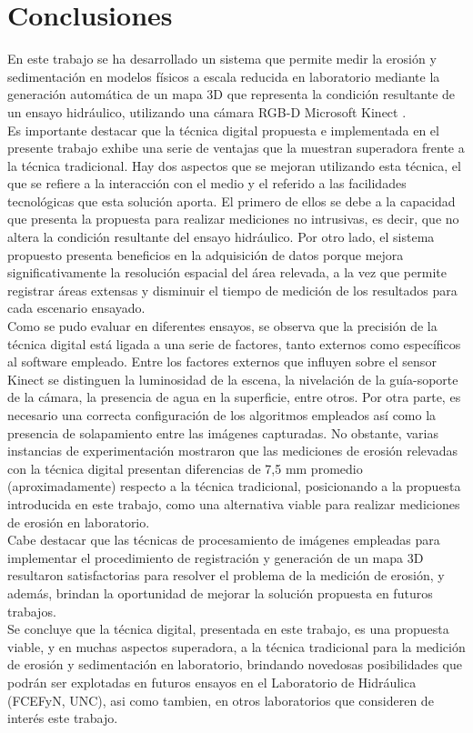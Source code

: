 \chapter{Conclusiones}

En este trabajo se ha desarrollado un sistema que permite medir la erosión y sedimentación en modelos físicos a escala reducida en laboratorio mediante la generación automática de un mapa 3D que representa la condición resultante de un ensayo hidráulico, utilizando una cámara RGB-D Microsoft Kinect \cite{microsoft-kinect}. \\
Es importante destacar que la técnica digital propuesta e implementada en el presente trabajo exhibe una serie de ventajas que la muestran superadora frente a la técnica tradicional. Hay dos aspectos que se mejoran utilizando esta técnica, el que se refiere a la interacción con el medio y el referido a las facilidades tecnológicas que esta solución aporta. El primero de ellos se debe a la capacidad que presenta la propuesta para realizar mediciones no intrusivas, es decir, que no altera la condición resultante del ensayo hidráulico. Por otro lado, el sistema propuesto presenta beneficios en la adquisición de datos porque mejora significativamente la resolución espacial del área relevada, a la vez que permite registrar áreas extensas y disminuir el tiempo de medición de los resultados para cada escenario ensayado. \\
Como se pudo evaluar en diferentes ensayos, se observa que la precisión de la técnica digital está ligada a una serie de factores, tanto externos como específicos al software empleado. Entre los factores externos que influyen sobre el sensor Kinect se distinguen la luminosidad de la escena, la nivelación de la guía-soporte de la cámara, la presencia de agua en la superficie, entre otros. Por otra parte, es necesario una correcta configuración de los algoritmos empleados así como la presencia de solapamiento entre las imágenes capturadas. No obstante, varias instancias de experimentación mostraron que las mediciones de erosión relevadas con la técnica digital presentan diferencias de 7,5 mm promedio (aproximadamente) respecto a la técnica tradicional, posicionando a la propuesta introducida en este trabajo, como una alternativa viable para realizar mediciones de erosión en laboratorio. \\
Cabe destacar que las técnicas de procesamiento de imágenes empleadas para implementar el procedimiento de registración y generación de un mapa 3D  resultaron satisfactorias para resolver el problema de la medición de erosión, y además, brindan la oportunidad de mejorar la solución propuesta en futuros trabajos. \\
Se concluye que la técnica digital, presentada en este trabajo, es una propuesta viable, y en muchas aspectos superadora, a la técnica tradicional para la medición de erosión y sedimentación en laboratorio, brindando novedosas posibilidades que podrán ser explotadas en futuros ensayos en el Laboratorio de Hidráulica (FCEFyN, UNC), asi como tambien, en otros laboratorios que consideren de interés este trabajo.